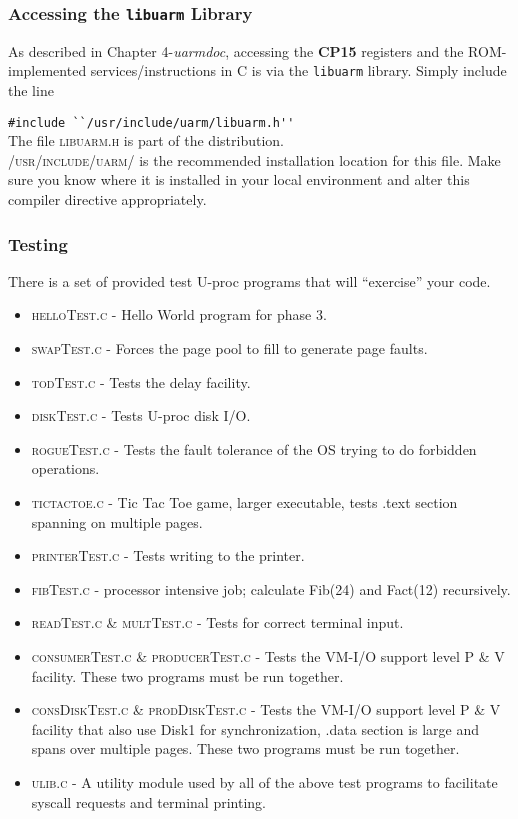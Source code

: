 \subsubsection{Accessing the \texttt{libuarm} Library}
As described in Chapter 4-\emph{uarmdoc}, accessing the \textbf{CP15} registers and the ROM-\linebreak implemented services/instructions in C is via the \texttt{libuarm} library. 
Simply include the line

\verb+#include ``/usr/include/uarm/libuarm.h''+\\
The file \textsc{libuarm.h} is part of the \uarm{} distribution.\\
\textsc{/usr/include/uarm/} is the recommended installation location for this file. 
Make sure you know where it is installed in your local environment and alter this compiler directive appropriately.


\subsubsection{Testing}
There is a set of provided test U-proc programs that will ``exercise'' your code.
\begin{itemize}
\item \textsc{helloTest.c} - Hello World program for phase 3.
\item \textsc{swapTest.c} - Forces the page pool to fill to generate page faults.
\item \textsc{todTest.c} - Tests the delay facility.
\item \textsc{diskTest.c} - Tests U-proc disk I/O.
\item \textsc{rogueTest.c} - Tests the fault tolerance of the OS trying to do forbidden operations.
\item \textsc{tictactoe.c} - Tic Tac Toe game, larger executable, tests .text section spanning on multiple pages.
\item \textsc{printerTest.c} - Tests writing to the printer.
\item \textsc{fibTest.c} - processor intensive job; calculate Fib(24) and Fact(12) recursively.
\item \textsc{readTest.c} \& \textsc{multTest.c} - Tests for correct terminal input.
\item \textsc{consumerTest.c} \& \textsc{producerTest.c} - Tests the VM-I/O support level P \& V facility. 
These two programs must be run together.
\item \textsc{consDiskTest.c} \& \textsc{prodDiskTest.c} - Tests the VM-I/O support level P \& V facility that also use Disk1 for synchronization, .data section is large and spans over multiple pages. 
These two programs must be run together.

\item \textsc{ulib.c} - A utility module used by all of the above test programs to facilitate syscall requests and terminal printing.
\end{itemize}

